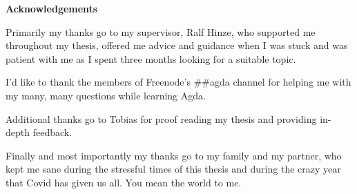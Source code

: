 \newpage
\thispagestyle{empty}
\hspace{0pt}
\vfill
\begin{center}
    \textbf{Acknowledgements}
\end{center}

\noindent Primarily my thanks go to my supervisor, Ralf Hinze, who supported me throughout my thesis, offered me advice and guidance when I was stuck and was patient with me as I spent three months looking for a suitable topic.

I'd like to thank the members of Freenode's \#\#agda channel for helping me with my many, many questions while learning Agda.

Additional thanks go to Tobias for proof reading my thesis and providing in-depth feedback.

Finally and most importantly my thanks go to my family and my partner, who kept me sane during the stressful times of this thesis and during the crazy year that Covid has given us all. You mean the world to me.

\vfill
\hspace{0pt}
